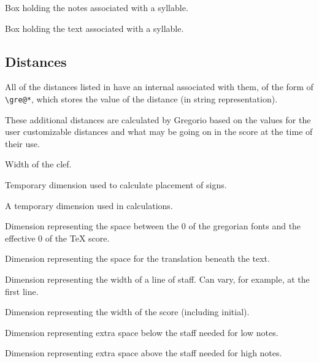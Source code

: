 Box holding the notes associated with a syllable.

Box holding the text associated with a syllable.



\subsection{Distances}
All of the distances listed in  have an internal
associated with them, of the form of \verb=\gre@*=, which stores the value of the distance (in
string representation).

These additional distances are calculated by Gregorio based on the values for the user customizable distances and what may be going on in the score at the time of their use.

Width of the clef.

Temporary dimension used to calculate placement of signs.

A temporary dimension used in calculations.

Dimension representing the space between the 0 of the gregorian fonts and the effective 0 of the TeX score.

Dimension representing the space for the translation beneath the text.

Dimension representing the width of a line of staff.  Can vary, for
example, at the first line.

Dimension representing the width of the score (including initial).

Dimension representing extra space below the staff needed for low notes.

Dimension representing extra space above the staff needed for high notes.

